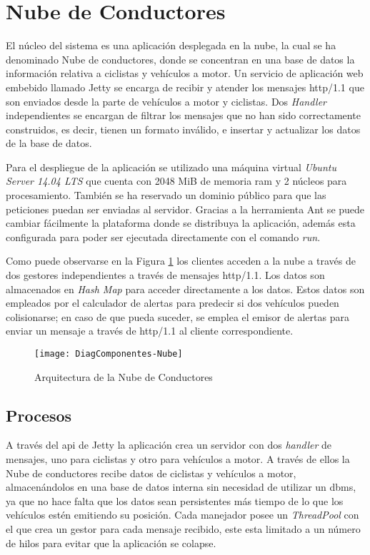 \section{Nube de Conductores}\label{section:NubeConductores}
El núcleo del sistema es una aplicación desplegada en la nube, la cual se ha
denominado Nube de conductores, donde se concentran en una base de datos la
información relativa a ciclistas y vehículos a motor. Un servicio de aplicación
web embebido llamado Jetty se encarga de recibir y atender los mensajes
\Gls{http/1.1} que son enviados desde la parte de vehículos a motor y
ciclistas. Dos \emph{Handler} independientes se encargan de filtrar los
mensajes que no han sido correctamente construidos, es decir, tienen un formato
inválido, e insertar y actualizar los datos de la base de datos.

Para el despliegue de la aplicación se utilizado una máquina virtual
\emph{Ubuntu Server 14.04 LTS} que cuenta con 2048 MiB de memoria \gls{ram} y 2
núcleos para procesamiento. También se ha reservado un dominio público para que
las peticiones puedan ser enviadas al servidor. Gracias a la herramienta Ant se
puede cambiar fácilmente la plataforma donde se distribuya la aplicación,
además esta configurada para poder ser ejecutada directamente con el comando
\emph{run}.

Como puede observarse en la Figura \ref{fig:DiagComponentes-Nube} los clientes
acceden a la nube a través de dos gestores independientes a través de mensajes
\Gls{http/1.1}. Los datos son almacenados en \emph{Hash Map} para acceder
directamente a los datos. Estos datos son empleados por el calculador de
alertas para predecir si dos vehículos pueden colisionarse; en caso de que
pueda suceder, se emplea el emisor de alertas para enviar un mensaje a través
de \Gls{http/1.1} al cliente correspondiente.

\begin{figure}[h]
	\begin{center}
		\texttt{[image: DiagComponentes-Nube]}
		\caption{Arquitectura de la Nube de Conductores}
		\label{fig:DiagComponentes-Nube}
	\end{center}
\end{figure}

\FloatBarrier
\subsection{Procesos}\label{ssection:procesos}
A través del \gls{api} de Jetty la aplicación crea un servidor con dos
\emph{handler} de mensajes, uno para ciclistas y otro para vehículos a motor. A
través de ellos la Nube de conductores recibe datos de ciclistas y vehículos a
motor, almacenándolos en una base de datos interna sin necesidad de utilizar un
\gls{dbms}, ya que no hace falta que los datos sean persistentes más tiempo de
lo que los vehículos estén emitiendo su posición. Cada manejador posee un
\emph{ThreadPool} con el que crea un gestor para cada mensaje recibido, este
esta limitado a un número de hilos para evitar que la aplicación se colapse.

